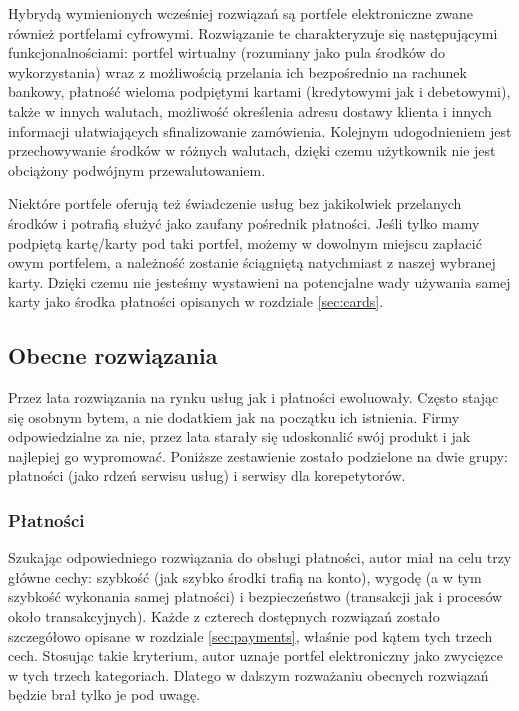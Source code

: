 \documentclass[12pt]{article}
\numberwithin{figure}{section}
\begin{document}
\begin{sloppypar}
Hybrydą wymienionych wcześniej rozwiązań są portfele elektroniczne zwane również portfelami cyfrowymi. Rozwiązanie te charakteryzuje się następującymi funkcjonalnościami: 
portfel wirtualny (rozumiany jako pula środków do wykorzystania) wraz z możliwością przelania ich bezpośrednio na rachunek bankowy, płatność wieloma podpiętymi kartami (kredytowymi jak i debetowymi), także w innych walutach, możliwość określenia adresu dostawy klienta i innych informacji ułatwiających sfinalizowanie zamówienia. Kolejnym udogodnieniem jest przechowywanie środków w różnych walutach, dzięki czemu użytkownik nie jest obciążony podwójnym przewalutowaniem.

Niektóre portfele oferują też świadczenie usług bez jakikolwiek przelanych środków i potrafią służyć jako zaufany pośrednik płatności. Jeśli tylko mamy podpiętą kartę/karty pod taki portfel, możemy w dowolnym miejscu zapłacić owym portfelem, a należność zostanie ściągniętą natychmiast z naszej wybranej karty. Dzięki czemu nie jesteśmy wystawieni na potencjalne wady używania samej karty jako środka płatności opisanych w rozdziale \ref{sec:cards}.

\subsection{Obecne rozwiązania}
Przez lata rozwiązania na rynku usług jak i płatności ewoluowały. Często stając się osobnym bytem, a nie dodatkiem jak na początku ich istnienia. Firmy odpowiedzialne za nie, przez lata starały się udoskonalić swój produkt i jak najlepiej go wypromować. Poniższe zestawienie zostało podzielone na dwie grupy: płatności (jako rdzeń serwisu usług) i serwisy dla korepetytorów.

\subsubsection{Płatności}
Szukając odpowiedniego rozwiązania do obsługi płatności, autor miał na celu trzy główne cechy: szybkość (jak szybko środki trafią na konto), wygodę (a w tym szybkość wykonania samej płatności) i bezpieczeństwo (transakcji jak i procesów około transakcyjnych). Każde z czterech dostępnych rozwiązań zostało szczegółowo opisane w rozdziale \ref{sec:payments}, właśnie pod kątem tych trzech cech. Stosując takie kryterium, autor uznaje portfel elektroniczny jako zwycięzce w tych trzech kategoriach. Dlatego w dalszym rozważaniu obecnych rozwiązań będzie brał tylko je pod uwagę.


\end{sloppypar}
\end{document}
